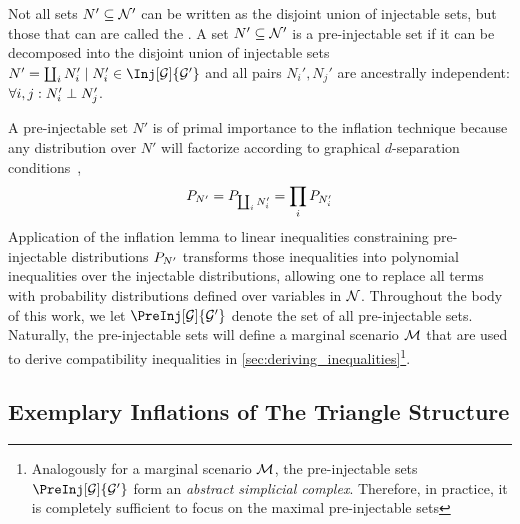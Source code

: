 \documentclass[aps, 10pt, english, twoside, pra, nofootinbib, tightenlines, longbibliography, superscriptaddress]{revtex4-1}
\begin{document}
    Not all sets $N' \subseteq \mathcal{N}'$ can be written as the disjoint union of injectable sets, but those that can are called the . A set $N' \subseteq \mathcal{N}'$ is a pre-injectable set if it can be decomposed into the disjoint union of injectable sets $N' = \coprod_{i} N'_i \mid N'_i \in \Inj[\graph]{\graph'}$ and all pairs $N_i', N_j'$ are ancestrally independent: $\forall i, j : N_i' \perp N_j'$.

    A pre-injectable set $N'$ is of primal importance to the inflation technique because any distribution over $N'$ will factorize according to graphical $d$-separation conditions~\cite{Pearl_2009},
    \[ \prob[N'] = \prob[\coprod_i N'_i] = \prod_{i}\prob[N'_i] \]
    Application of the inflation lemma to linear inequalities constraining pre-injectable distributions $\prob[N']$ transforms those inequalities into polynomial inequalities over the injectable distributions, allowing one to replace all terms with probability distributions defined over variables in $\mathcal{N}$. Throughout the body of this work, we let $\PreInj[\graph]{\graph'}$ denote the set of all pre-injectable sets. Naturally, the pre-injectable sets will define a marginal scenario $\mathcal{M}$ that are used to derive compatibility inequalities in \cref{sec:deriving_inequalities}\footnote{Analogously for a marginal scenario $\mathcal{M}$, the pre-injectable sets $\PreInj[\graph]{\graph'}$ form an \textit{abstract simplicial complex}. Therefore, in practice, it is completely sufficient to focus on the maximal pre-injectable sets}.

    \subsection{Exemplary Inflations of The Triangle Structure}
    \label{sec:exemplary_inflations_of_the_triangle structure}
\end{document}
